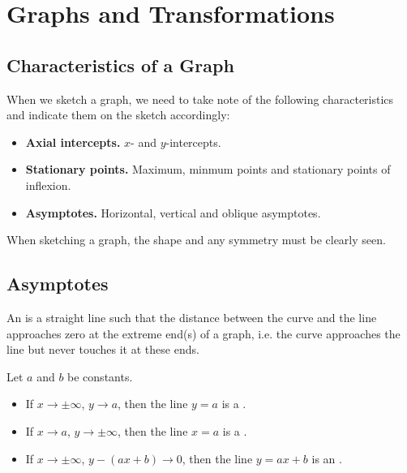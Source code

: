 \chapter{Graphs and Transformations}

\section{Characteristics of a Graph}

When we sketch a graph, we need to take note of the following characteristics and indicate them on the sketch accordingly:
\begin{itemize}
    \item \textbf{Axial intercepts.} $x$- and $y$-intercepts.
    \item \textbf{Stationary points.} Maximum, minmum points and stationary points of inflexion.
    \item \textbf{Asymptotes.} Horizontal, vertical and oblique asymptotes.
\end{itemize}

When sketching a graph, the shape and any symmetry must be clearly seen.

\section{Asymptotes}

\begin{definition}
    An  is a straight line such that the distance between the curve and the line approaches zero at the extreme end(s) of a graph, i.e. the curve approaches the line but never touches it at these ends.
\end{definition}

\begin{definition}
    Let $a$ and $b$ be constants.

    \begin{itemize}
        \item If $x \to \pm \infty$, $y \to a$, then the line $y = a$ is a .
        \item If $x \to a$, $y \to \pm \infty$, then the line $x = a$ is a .
        \item If $x \to \pm \infty$, $y - (ax + b) \to 0$, then the line $y = ax + b$ is an .
    \end{itemize}
\end{definition}

